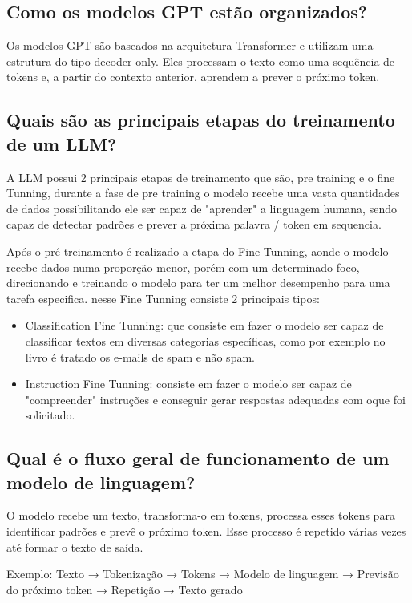 \subsection{Como os modelos GPT estão organizados?}
Os modelos GPT são baseados na arquitetura Transformer e utilizam uma estrutura do tipo decoder-only. Eles processam o texto como uma sequência de tokens e, a partir do contexto anterior, aprendem a prever o próximo token.

\subsection{Quais são as principais etapas do treinamento de um LLM?}
A LLM possui 2 principais etapas de treinamento que são, pre training e o fine Tunning, durante a fase de pre training o modelo recebe uma vasta quantidades de dados possibilitando ele ser capaz de "aprender" a linguagem humana, sendo capaz de detectar padrões e prever a próxima palavra / token em sequencia. 

Após o pré treinamento é realizado a etapa do Fine Tunning, aonde o modelo recebe dados numa proporção menor, porém com um determinado foco, direcionando e treinando o modelo para ter um melhor desempenho para uma tarefa especifica. nesse Fine Tunning consiste 2 principais tipos:
\begin{itemize}
    \item Classification Fine Tunning: que consiste em fazer o modelo ser capaz de classificar textos em diversas categorias específicas, como por exemplo no livro é tratado os e-mails de spam e não spam.
    \item Instruction Fine Tunning: consiste em fazer o modelo ser capaz de "compreender" instruções e conseguir gerar respostas adequadas com oque foi solicitado.
\end{itemize}

\subsection{Qual é o fluxo geral de funcionamento de um modelo de linguagem?}
O modelo recebe um texto, transforma-o em tokens, processa esses tokens para identificar padrões e prevê o próximo token. Esse processo é repetido várias vezes até formar o texto de saída.

Exemplo:
Texto → Tokenização → Tokens → Modelo de linguagem → Previsão do próximo token → Repetição → Texto gerado
